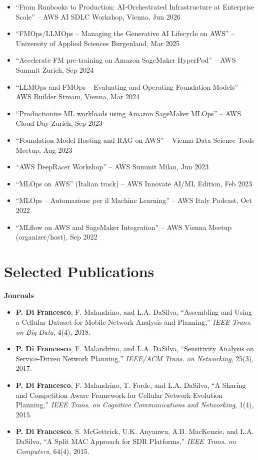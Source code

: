 \documentclass[11pt,a4paper]{article}
\begin{document}
\begin{itemize}[nosep,leftmargin=*]
\item ``From Runbooks to Production: AI-Orchestrated Infrastructure at Enterprise Scale'' -- AWS AI SDLC Workshop, Vienna, Jun 2026
\item ``FMOps/LLMOps -- Managing the Generative AI Lifecycle on AWS'' -- University of Applied Sciences Burgenland, Mar 2025
\item ``Accelerate FM pre-training on Amazon SageMaker HyperPod'' -- AWS Summit Zurich, Sep 2024
\item ``LLMOps and FMOps -- Evaluating and Operating Foundation Models'' -- AWS Builder Stream, Vienna, Mar 2024
\item ``Productionize ML workloads using Amazon SageMaker MLOps'' -- AWS Cloud Day Zurich, Sep 2023
\item ``Foundation Model Hosting and RAG on AWS'' -- Vienna Data Science Tools Meetup, Aug 2023
\item ``AWS DeepRacer Workshop'' -- AWS Summit Milan, Jun 2023
\item ``MLOps on AWS'' (Italian track) -- AWS Innovate AI/ML Edition, Feb 2023
\item ``MLOps -- Automazione per il Machine Learning'' -- AWS Italy Podcast, Oct 2022
\item ``MLflow on AWS and SageMaker Integration'' -- AWS Vienna Meetup (organizer/host), Sep 2022
\end{itemize}

\section{Selected Publications}

\textbf{Journals}
\begin{itemize}[nosep,leftmargin=*]
\item \textbf{P. Di Francesco}, F. Malandrino, and L.A. DaSilva, ``Assembling and Using a Cellular Dataset for Mobile Network Analysis and Planning,'' \textit{IEEE Trans. on Big Data}, 4(4), 2018.
\item \textbf{P. Di Francesco}, F. Malandrino, and L.A. DaSilva, ``Sensitivity Analysis on Service-Driven Network Planning,'' \textit{IEEE/ACM Trans. on Networking}, 25(3), 2017.
\item \textbf{P. Di Francesco}, F. Malandrino, T. Forde, and L.A. DaSilva, ``A Sharing and Competition Aware Framework for Cellular Network Evolution Planning,'' \textit{IEEE Trans. on Cognitive Communications and Networking}, 1(4), 2015.
\item \textbf{P. Di Francesco}, S. McGettrick, U.K. Anyanwu, A.B. MacKenzie, and L.A. DaSilva, ``A Split MAC Approach for SDR Platforms,'' \textit{IEEE Trans. on Computers}, 64(4), 2015.
\end{itemize}
\end{document}
